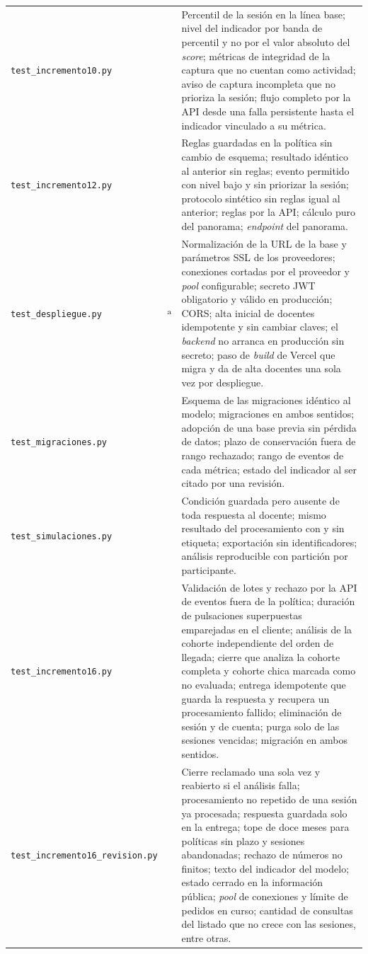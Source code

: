 {\begin{longtable}{>{\raggedright\arraybackslash}p{4.4cm} >{\raggedright\arraybackslash}p{1cm} >{\raggedright\arraybackslash}p{9.2cm}}
        \texttt{test\_incremento10.py} & 6 & Percentil de la sesión en la línea base; nivel del indicador por banda de percentil y no por el valor absoluto del \textit{score}; métricas de integridad de la captura que no cuentan como actividad; aviso de captura incompleta que no prioriza la sesión; flujo completo por la API desde una falla persistente hasta el indicador vinculado a su métrica. \\
        \texttt{test\_incremento12.py} & 7 & Reglas guardadas en la política sin cambio de esquema; resultado idéntico al anterior sin reglas; evento permitido con nivel bajo y sin priorizar la sesión; protocolo sintético sin reglas igual al anterior; reglas por la API; cálculo puro del panorama; \textit{endpoint} del panorama. \\
        \texttt{test\_despliegue.py} & 21\textsuperscript{a} & Normalización de la URL de la base y parámetros SSL de los proveedores; conexiones cortadas por el proveedor y \textit{pool} configurable; secreto JWT obligatorio y válido en producción; CORS; alta inicial de docentes idempotente y sin cambiar claves; el \textit{backend} no arranca en producción sin secreto; paso de \textit{build} de Vercel que migra y da de alta docentes una sola vez por despliegue. \\
        \texttt{test\_migraciones.py} & 6 & Esquema de las migraciones idéntico al modelo; migraciones en ambos sentidos; adopción de una base previa sin pérdida de datos; plazo de conservación fuera de rango rechazado; rango de eventos de cada métrica; estado del indicador al ser citado por una revisión. \\
        \texttt{test\_simulaciones.py} & 7 & Condición guardada pero ausente de toda respuesta al docente; mismo resultado del procesamiento con y sin etiqueta; exportación sin identificadores; análisis reproducible con partición por participante. \\
        \texttt{test\_incremento16.py} & 10 & Validación de lotes y rechazo por la API de eventos fuera de la política; duración de pulsaciones superpuestas emparejadas en el cliente; análisis de la cohorte independiente del orden de llegada; cierre que analiza la cohorte completa y cohorte chica marcada como no evaluada; entrega idempotente que guarda la respuesta y recupera un procesamiento fallido; eliminación de sesión y de cuenta; purga solo de las sesiones vencidas; migración en ambos sentidos. \\
        \texttt{test\_incremento16\_revision.py} & 13 & Cierre reclamado una sola vez y reabierto si el análisis falla; procesamiento no repetido de una sesión ya procesada; respuesta guardada solo en la entrega; tope de doce meses para políticas sin plazo y sesiones abandonadas; rechazo de números no finitos; texto del indicador del modelo; estado cerrado en la información pública; \textit{pool} de conexiones y límite de pedidos en curso; cantidad de consultas del listado que no crece con las sesiones, entre otras. \\

\end{longtable}}

